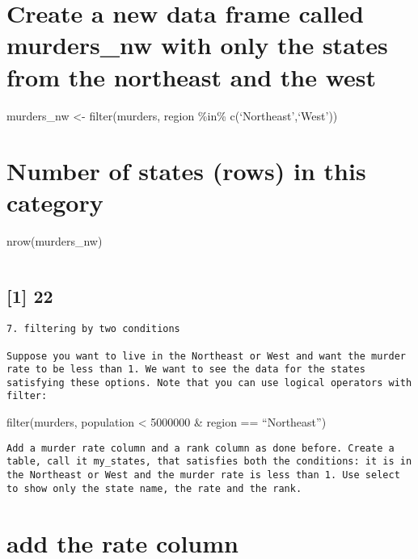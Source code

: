 \documentclass[
]{article}
\begin{document}
\hypertarget{create-a-new-data-frame-called-murders_nw-with-only-the-states-from-the-northeast-and-the-west}{%
\section{Create a new data frame called murders\_nw with only the states
from the northeast and the
west}\label{create-a-new-data-frame-called-murders_nw-with-only-the-states-from-the-northeast-and-the-west}}

murders\_nw \textless- filter(murders, region \%in\%
c(`Northeast',`West'))

\hypertarget{number-of-states-rows-in-this-category}{%
\section{Number of states (rows) in this
category}\label{number-of-states-rows-in-this-category}}

nrow(murders\_nw)

\begin{verbatim}
\end{verbatim}

\hypertarget{section-2}{%
\subsection{{[}1{]} 22}\label{section-2}}

\begin{verbatim}
7. filtering by two conditions

Suppose you want to live in the Northeast or West and want the murder rate to be less than 1. We want to see the data for the states satisfying these options. Note that you can use logical operators with filter:
\end{verbatim}

filter(murders, population \textless{} 5000000 \& region ==
``Northeast'')

\begin{verbatim}
Add a murder rate column and a rank column as done before. Create a table, call it my_states, that satisfies both the conditions: it is in the Northeast or West and the murder rate is less than 1. Use select to show only the state name, the rate and the rank.
\end{verbatim}

\hypertarget{add-the-rate-column}{%
\section{add the rate column}\label{add-the-rate-column}}
\end{document}
